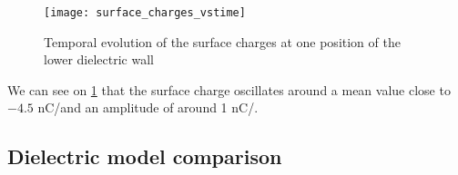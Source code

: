     \begin{figure}[hbtp]
      \centering
      \texttt{[image: surface\_charges\_vstime]}
      \caption{Temporal evolution of the surface charges at one position of the lower dielectric wall}
      \label{fig-sigma_time}
    \end{figure}
  
    
    We can see on \cref{fig-sigma_time} that the surface charge oscillates around a mean value close to $-4.5$ nC/\square\meter and an amplitude of around 1 nC/\square\meter.
    
    
    
    
  \subsection{Dielectric model comparison} \label{subsec-modelcomp}
  
